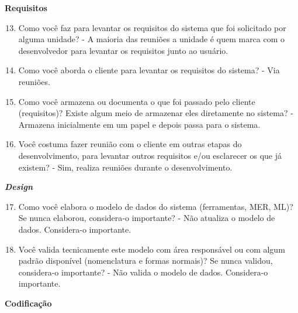 \begin{anexosenv}
\textbf{Requisitos}

\begin{enumerate}
\setcounter{enumi}{12}
\item Como você faz para levantar os requisitos do sistema que foi solicitado por alguma
unidade?\newline
- A maioria das reuniões a unidade é quem marca com o desenvolvedor para levantar os requisitos junto ao usuário.
\item Como você aborda o cliente para levantar os requisitos do sistema?\newline
- Via reuniões.
\item Como você armazena ou documenta o que foi passado pelo cliente (requisitos)? Existe
algum meio de armazenar eles diretamente no sistema?\newline
- Armazena inicialmente em um papel e depois passa para o sistema.
\item Você costuma fazer reunião com o cliente em outras etapas do desenvolvimento, para
levantar outros requisitos e/ou esclarecer os que já existem?\newline
- Sim, realiza reuniões durante o desenvolvimento.
\end{enumerate}

\textbf{\textit{Design}}

\begin{enumerate}
\setcounter{enumi}{16}
\item Como você elabora o modelo de dados do sistema (ferramentas, MER, ML)? Se nunca
elaborou, considera-o importante?\newline
- Não atualiza o modelo de dados. Considera-o importante.
\item Você valida tecnicamente este modelo com área responsável ou com algum padrão
disponível (nomenclatura e formas normais)? Se nunca validou, considera-o importante?\newline
- Não valida o modelo de dados. Considera-o importante.
\end{enumerate}

\textbf{Codificação}


\end{anexosenv}
